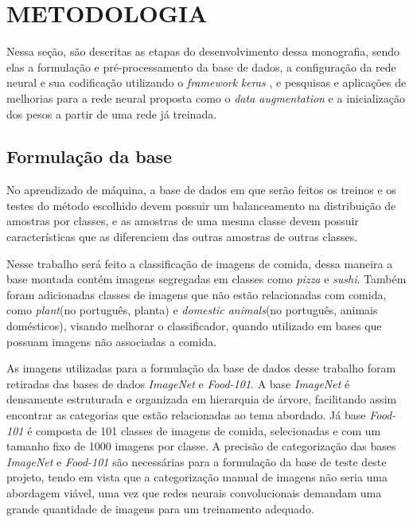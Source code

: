 
\chapter{METODOLOGIA}
\label{chap:metodologia}
Nessa seção, são descritas as etapas do desenvolvimento dessa monografia, sendo elas a formulação e pré-processamento da base de dados, a configuração da rede neural e sua codificação utilizando o \textit{framework} \textit{keras} \cite{chollet2015keras}, e pesquisas e aplicações de melhorias para a rede neural proposta como o \textit{data augmentation} e a inicialização dos pesos a partir de uma rede já treinada.

\section{Formulação da base}
No aprendizado de máquina, a base de dados em que serão feitos os treinos e os testes do método escolhido devem possuir um balanceamento na distribuição de amostras por classes, e as amostras de uma mesma classe devem possuir características que as diferenciem das outras amostras de outras classes.

\par Nesse trabalho será feito a classificação de imagens de comida, dessa maneira a base montada contém imagens segregadas em classes como \textit{pizza} e \textit{sushi}. Também foram adicionadas classes de imagens que não estão relacionadas com comida, como \textit{plant}(no português, planta) e \textit{domestic animals}(no português, animais domésticos), visando melhorar o classificador, quando utilizado em bases que possuam imagens não associadas a comida.
\par As imagens utilizadas para a formulação da base de dados desse trabalho foram retiradas das bases de dados \textit{ImageNet}\cite{deng2009imagenet} e \textit{Food-101}\cite{bossard14}. A base \textit{ImageNet} é densamente estruturada e organizada em hierarquia de árvore, facilitando assim encontrar as categorias que estão relacionadas ao tema abordado. Já base \textit{Food-101} é composta de 101 classes de imagens de comida, selecionadas e com um tamanho fixo de 1000 imagens por classe. A precisão de categorização das bases \textit{ImageNet} e \textit{Food-101} são necessárias para a formulação da base de teste deste projeto, tendo em vista que a categorização manual de imagens não seria uma abordagem viável, uma vez que redes neurais convolucionais demandam uma grande quantidade de imagens para um treinamento adequado.  

